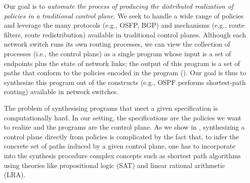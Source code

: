 Our goal is to {\em automate the process of producing the distributed
realization of policies in a traditional control plane}. We seek to handle
a wide range of policies and leverage the many protocols (e.g., OSFP, BGP) and
mechanisms (e.g., route filters, route redistribution) available in
traditional control planes. Although each network switch runs its own routing
processes, we can view the collection of processes (i.e., the control plane)
as a single program whose input is a set of endpoints plus the state
of network links; the output of this program is a set of paths that conform to
the policies encoded in the program (). Our goal is
thus to synthesize this program out of the constructs 
(e.g., OSPF performs shortest-path routing) available in network switches.


The problem of synthesising programs that meet a given specification
is computationally hard. In our setting, 
the specifications are the policies we want to realize and the programs 
are the control plane.
As we show in , synthesizing a control plane
directly from policies is complicated by the fact that, to infer the concrete
set of paths induced by a given control plane, one has to incorporate
into the synthesis procedure complex concepts such as shortest path algorithms
using theories like propositional logic (SAT) and linear rational
arithmetic (LRA).

